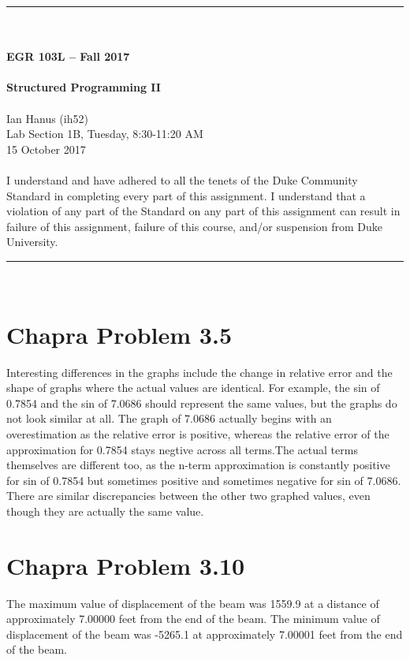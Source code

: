 \documentclass{article}
\begin{document}
\begin{center}
\rule{6.5in}{0.5mm}\\~\\
\textbf{\large EGR 103L -- Fall 2017}\\~\\
\textbf{\huge Structured Programming II}\\~\\
Ian Hanus (ih52)\\
Lab Section 1B, Tuesday, 8:30-11:20 AM\\
15 October 2017\\~\\
{\small I understand and have adhered to all the tenets of the Duke
  Community Standard in completing every part of this assignment.  I
  understand that a violation of any part of the Standard on any part
  of this assignment can result in failure of this assignment, failure
  of this course, and/or suspension from Duke University.} 
\rule{6.5in}{0.5mm}\\
\end{center}
\tableofcontents
\listoffigures
\pagebreak

\section{Chapra Problem 3.5}
Interesting differences in the graphs include the change in relative error and the shape of graphs where the actual values are identical. For example, the sin of 0.7854 and the sin of 7.0686 should represent the same values, but the graphs do not look similar at all. The graph of 7.0686 actually begins with an overestimation as the relative error is positive, whereas the relative error of the approximation for 0.7854 stays negtive across all terms.The actual terms themselves are different too, as the n-term approximation is constantly positive for sin of 0.7854 but sometimes positive and sometimes negative for sin of 7.0686. There are similar discrepancies between the other two graphed values, even though they are actually the same value.
\section{Chapra Problem 3.10}
The maximum value of displacement of the beam was 1559.9 at a distance of approximately 7.00000 feet from the end of the beam. The minimum value of displacement of the beam was -5265.1 at approximately 7.00001 feet from the end of the beam.
\end{document}
